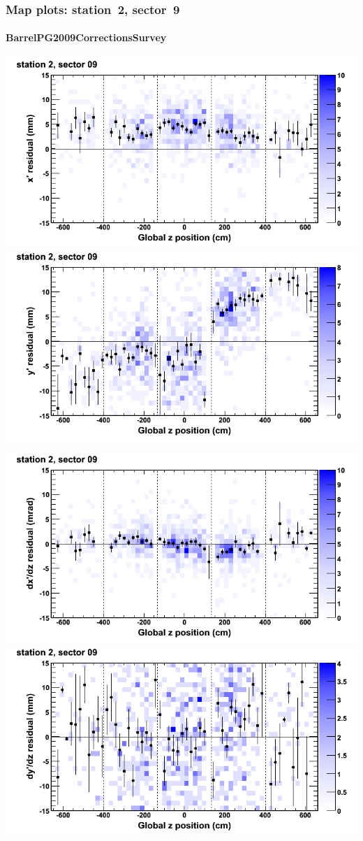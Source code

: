 \documentclass[compress]{beamer}
\begin{document}
\begin{frame}
\frametitle{Map plots: station~2, sector~9}
\framesubtitle{BarrelPG2009CorrectionsSurvey}
\includegraphics[width=0.5\linewidth]{mapplots_01/DTvsz_st2sec09_x.png}
\includegraphics[width=0.5\linewidth]{mapplots_01/DTvsz_st2sec09_y.png}

\includegraphics[width=0.5\linewidth]{mapplots_01/DTvsz_st2sec09_dxdz.png}
\includegraphics[width=0.5\linewidth]{mapplots_01/DTvsz_st2sec09_dydz.png}
\end{frame}
\end{document}

